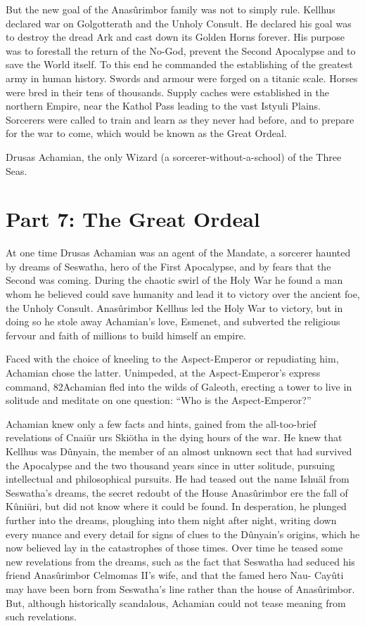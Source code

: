 \documentclass[]{book}
\begin{document}
But the new goal of the Anasûrimbor family was not to simply rule. Kellhus declared
war on Golgotterath and the Unholy Consult. He declared his goal was to destroy the
dread Ark and cast down its Golden Horns forever. His purpose was to forestall the
return of the No-God, prevent the Second Apocalypse and to save the World itself. To
this end he commanded the establishing of the greatest army in human history. Swords
and armour were forged on a titanic scale. Horses were bred in their tens of thousands.
Supply caches were established in the northern Empire, near the Kathol Pass leading to
the vast Istyuli Plains. Sorcerers were called to train and learn as they never had before,
and to prepare for the war to come, which would be known as the Great Ordeal.

Drusas Achamian, the only Wizard (a sorcerer-without-a-school) of the Three Seas.

\hypertarget{part-7-the-great-ordeal}{%
\chapter{Part 7: The Great Ordeal}\label{part-7-the-great-ordeal}}

At one time Drusas Achamian was an agent of the Mandate, a sorcerer haunted by
dreams of Seswatha, hero of the First Apocalypse, and by fears that the Second was
coming. During the chaotic swirl of the Holy War he found a man whom he believed
could save humanity and lead it to victory over the ancient foe, the Unholy Consult.
Anasûrimbor Kellhus led the Holy War to victory, but in doing so he stole away
Achamian's love, Esmenet, and subverted the religious fervour and faith of millions to
build himself an empire.

Faced with the choice of kneeling to the Aspect-Emperor or repudiating him,
Achamian chose the latter. Unimpeded, at the Aspect-Emperor's express command,
82Achamian fled into the wilds of Galeoth, erecting a tower to live in solitude and
meditate on one question: ``Who is the Aspect-Emperor?''

Achamian knew only a few facts and hints, gained from the all-too-brief revelations of
Cnaiür urs Skiötha in the dying hours of the war. He knew that Kellhus was Dûnyain,
the member of an almost unknown sect that had survived the Apocalypse and the two
thousand years since in utter solitude, pursuing intellectual and philosophical pursuits.
He had teased out the name Ishuäl from Seswatha's dreams, the secret redoubt of the
House Anasûrimbor ere the fall of Kûniüri, but did not know where it could be found.
In desperation, he plunged further into the dreams, ploughing into them night after
night, writing down every nuance and every detail for signs of clues to the Dûnyain's
origins, which he now believed lay in the catastrophes of those times. Over time he
teased some new revelations from the dreams, such as the fact that Seswatha had
seduced his friend Anasûrimbor Celmomas II's wife, and that the famed hero Nau-
Cayûti may have been born from Seswatha's line rather than the house of
Anasûrimbor. But, although historically scandalous, Achamian could not tease
meaning from such revelations.
\end{document}
